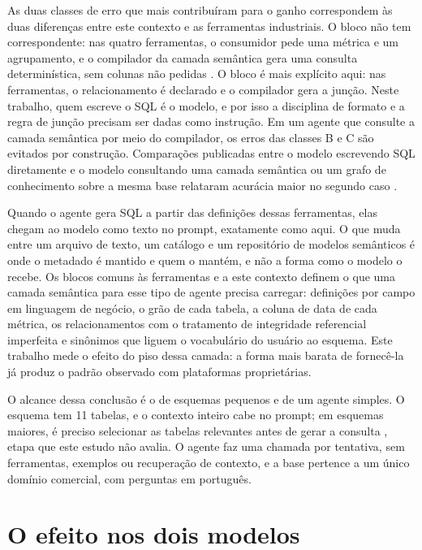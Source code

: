 As duas classes de erro que mais contribuíram para o ganho correspondem às
duas diferenças entre este contexto e as ferramentas industriais. O bloco
 não tem correspondente: nas quatro ferramentas, o
consumidor pede uma métrica e um agrupamento, e o compilador da camada
semântica gera uma consulta determinística, sem colunas não pedidas
\cite{dbt_slarchitecture,looker_lookml,cube_datamodel}. O
bloco  é mais explícito aqui: nas ferramentas, o
relacionamento é declarado e o compilador gera a junção. Neste trabalho,
quem escreve o SQL é o modelo, e por isso a disciplina de formato e a
regra de junção precisam ser dadas como instrução. Em um agente que
consulte a camada semântica por meio do compilador, os erros das classes B
e C são evitados por construção. Comparações publicadas entre o modelo
escrevendo SQL diretamente e o modelo consultando uma camada semântica ou
um grafo de conhecimento sobre a mesma base relataram acurácia maior no
segundo caso \cite{sequeda2023benchmark,ganz2026benchmark}.

Quando o agente gera SQL a partir das definições dessas ferramentas, elas
chegam ao modelo como texto no prompt, exatamente como aqui. O que muda
entre um arquivo de texto, um catálogo e um repositório de modelos
semânticos é onde o metadado é mantido e quem o mantém, e não a forma como
o modelo o recebe. Os blocos comuns às ferramentas e a este contexto
definem o que uma camada semântica para esse tipo de agente precisa
carregar: definições por campo em linguagem de negócio, o grão de cada
tabela, a coluna de data de cada métrica, os relacionamentos com o
tratamento de integridade referencial imperfeita e sinônimos que liguem o
vocabulário do usuário ao esquema. Este trabalho mede o efeito do piso
dessa camada: a forma mais barata de fornecê-la já produz o padrão
observado com plataformas proprietárias.

O alcance dessa conclusão é o de esquemas pequenos e de um agente simples.
O esquema tem 11 tabelas, e o contexto inteiro cabe no prompt; em esquemas
maiores, é preciso selecionar as tabelas relevantes antes de gerar a
consulta \cite{talaei2024chess,lei2025spider2}, etapa que este estudo não
avalia. O agente faz uma chamada por
tentativa, sem ferramentas, exemplos ou recuperação de contexto, e a base
pertence a um único domínio comercial, com perguntas em português.

\section{O efeito nos dois modelos}
\label{sec:modelo-menor}

